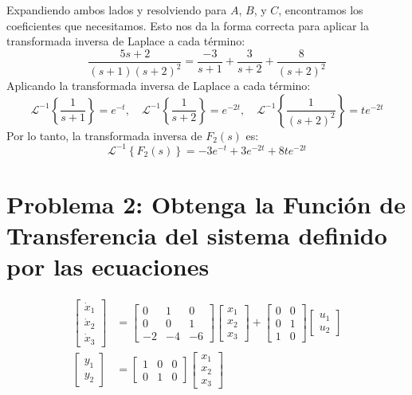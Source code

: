 \documentclass[10pt]{article}
\theoremstyle{definition}
\theoremstyle{remark}
\theoremstyle{definition}
\numberwithin{equation}{prob}
\begin{document}
Expandiendo ambos lados y resolviendo para \( A \), \( B \), y \( C \), encontramos los coeficientes que necesitamos. Esto nos da la forma correcta para aplicar la transformada inversa de Laplace a cada término:
\[
	\frac{5s + 2}{(s+1)(s+2)^2} = \frac{-3}{s+1} + \frac{3}{s+2} + \frac{8}{(s+2)^2}
\]
Aplicando la transformada inversa de Laplace a cada término:
\[
	\mathcal{L}^{-1}\left\{ \frac{1}{s+1} \right\} = e^{-t}, \quad \mathcal{L}^{-1}\left\{ \frac{1}{s+2} \right\} = e^{-2t}, \quad \mathcal{L}^{-1}\left\{ \frac{1}{(s+2)^2} \right\} = t e^{-2t}
\]
Por lo tanto, la transformada inversa de \( F_2(s) \) es:
\[
	\mathcal{L}^{-1}\left\{ F_2(s) \right\} = -3 e^{-t} + 3 e^{-2t} + 8 t e^{-2t}
\]

\newpage

\section{Problema 2: Obtenga la Función de Transferencia del sistema definido por las ecuaciones}

\begin{equation}
	\begin{aligned}
		\begin{bmatrix}
			\dot{x}_1 \\
			\dot{x}_2 \\
			\dot{x}_3
		\end{bmatrix}
		 & =
		\begin{bmatrix}
			0  & 1  & 0  \\
			0  & 0  & 1  \\
			-2 & -4 & -6
		\end{bmatrix}
		\begin{bmatrix}
			x_1 \\
			x_2 \\
			x_3
		\end{bmatrix}
		+
		\begin{bmatrix}
			0 & 0 \\
			0 & 1 \\
			1 & 0
		\end{bmatrix}
		\begin{bmatrix}
			u_1 \\
			u_2
		\end{bmatrix}
		\\
		\begin{bmatrix}
			y_1 \\
			y_2
		\end{bmatrix}
		 & =
		\begin{bmatrix}
			1 & 0 & 0 \\
			0 & 1 & 0
		\end{bmatrix}
		\begin{bmatrix}
			x_1 \\
			x_2 \\
			x_3
		\end{bmatrix}
	\end{aligned}
\end{equation}
\end{document}
